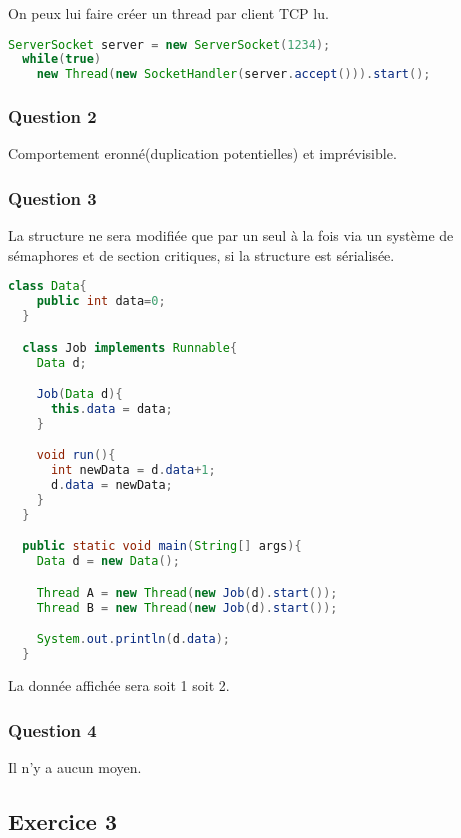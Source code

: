 On peux lui faire créer un thread par client TCP lu.

\begin{lstlisting}[language=Java,caption={Serveur TCP multi-thread en trois lignes},captionpos=b]
  ServerSocket server = new ServerSocket(1234);
  while(true)
    new Thread(new SocketHandler(server.accept())).start();
\end{lstlisting}

\subsubsection{Question 2}

Comportement eronné(duplication potentielles) et imprévisible.

\subsubsection{Question 3}

La structure ne sera modifiée que par un seul à la fois via un système de sémaphores et de section critiques, si la structure est sérialisée.

\begin{lstlisting}[language=Java,caption={Exemple d'écriture sur la même structure de données par deux threads},captionpos=b]
  class Data{
    public int data=0;
  }

  class Job implements Runnable{
    Data d;

    Job(Data d){
      this.data = data;
    }

    void run(){
      int newData = d.data+1;
      d.data = newData;
    }
  }

  public static void main(String[] args){
    Data d = new Data();

    Thread A = new Thread(new Job(d).start());
    Thread B = new Thread(new Job(d).start());

    System.out.println(d.data);
  }
\end{lstlisting}

La donnée affichée sera soit 1 soit 2.

\subsubsection{Question 4}

Il n'y a aucun moyen.

\subsection{Exercice 3}

